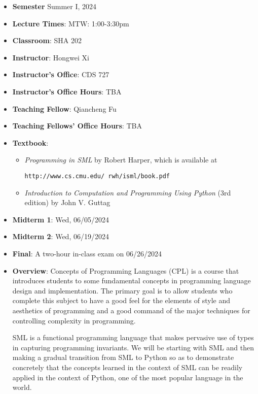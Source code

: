 \documentclass[11pt]{article}
\begin{document}
\begin{itemize}
\item {\bf Semester} Summer I, 2024

\item {\bf Lecture Times}: MTW: 1:00-3:30pm

\item {\bf Classroom}: SHA 202

\item {\bf Instructor}: Hongwei Xi
\item {\bf Instructor's Office}: CDS 727
\item {\bf Instructor's Office Hours}: TBA

\item {\bf Teaching Fellow}: Qiancheng Fu
\item {\bf Teaching Fellows' Office Hours}: TBA


\item {\bf Textbook}:\kern6pt
\begin{itemize}
\item
{\em Programming in SML} by Robert Harper, which is available at
\begin{center}
\texttt{http://www.cs.cmu.edu/~rwh/isml/book.pdf}
\end{center}
\item
{\em Introduction to Computation and Programming Using Python} (3rd edition) by John V. Guttag
\end{itemize}

\item
{\bf Midterm 1}\kern6pt: Wed, 06/05/2024
\item
{\bf Midterm 2}\kern6pt: Wed, 06/19/2024

\item {\bf Final}:\kern6pt A two-hour in-class exam on 06/26/2024

\item {\bf Overview}:
Concepts of Programming Languages (CPL) is a course that introduces
students to some fundamental concepts in programming language design and
implementation. The primary goal is to allow students who complete this
subject to have a good feel for the elements of style and aesthetics of
programming and a good command of the major techniques for controlling
complexity in programming.

SML is a functional programming language that makes pervasive use of
types in capturing programming invariants. We will be starting with
SML and then making a gradual transition from SML to Python so as to
demonstrate concretely that the concepts learned in the context of SML
can be readily applied in the context of Python, one of the most
popular language in the world.


\end{itemize}
\end{document}

